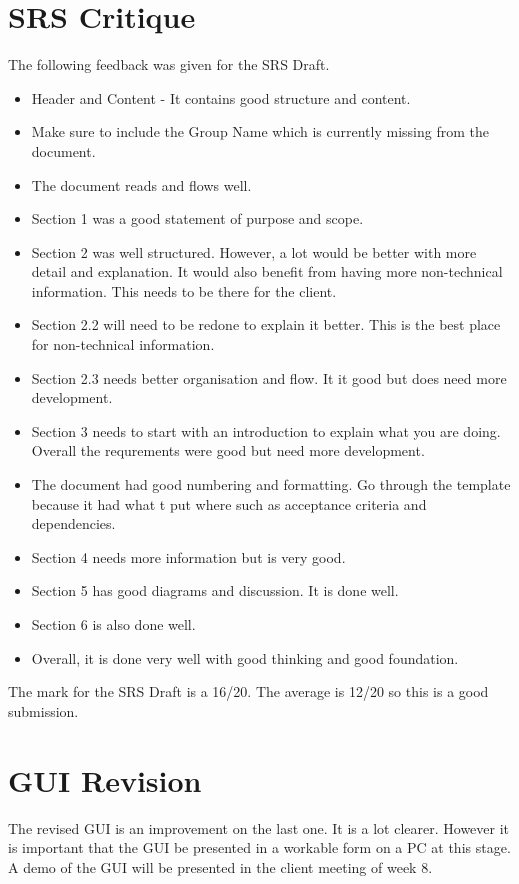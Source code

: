\documentclass[a4paper]{article}
\begin{document}
\section{SRS Critique}
The following feedback was given for the SRS Draft.
\begin{itemize}
	\item Header and Content - It contains good structure and content.
	\item Make sure to include the Group Name which is currently missing from the document.
	\item The document reads and flows well.
	\item Section 1 was a good statement of purpose and scope.
	\item Section 2 was well structured. However, a lot would be better with more detail and explanation. It would also benefit from having more non-technical information. This needs to be there for the client.
	\item Section 2.2 will need to be redone to explain it better. This is the best place for non-technical information.
	\item Section 2.3 needs better organisation and flow. It it good but does need more development.
	\item Section 3 needs to start with an introduction to explain what you are doing. Overall the requrements were good but need more development.
	\item The document had good numbering and formatting. Go through the template because it had what t put where such as acceptance criteria and dependencies.
	\item Section 4 needs more information but is very good.
	\item Section 5 has good diagrams and discussion. It is done well.
	\item Section 6 is also done well.
	\item Overall, it is done very well with good thinking and good foundation.
\end{itemize}
The mark for the SRS Draft is a 16/20. The average is 12/20 so this is a good submission.


\section{GUI Revision}
The revised GUI is an improvement on the last one. It is a lot clearer. However it is important that the GUI be presented in a workable form on a PC at this stage. A demo of the GUI will be presented in the client meeting of week 8.
\end{document}
